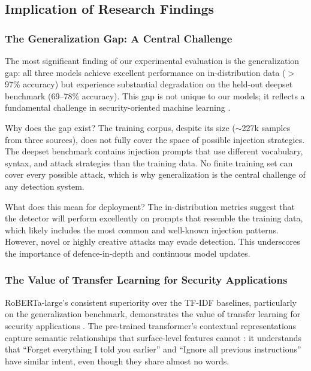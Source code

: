 \documentclass[12pt, letterpaper]{article}   %
\begin{document}
\subsection{Implication of Research Findings}

\subsubsection{The Generalization Gap: A Central Challenge}

The most significant finding of our experimental evaluation is the generalization gap: all three models achieve excellent performance on in-distribution data ($>$97\% accuracy) but experience substantial degradation on the held-out deepset benchmark (69--78\% accuracy). This gap is not unique to our models; it reflects a fundamental challenge in security-oriented machine learning \cite{ref10}\cite{ref3}.

Why does the gap exist? The training corpus, despite its size ($\sim$227k samples from three sources), does not fully cover the space of possible injection strategies. The deepset benchmark contains injection prompts that use different vocabulary, syntax, and attack strategies than the training data. No finite training set can cover every possible attack, which is why generalization is the central challenge of any detection system.

What does this mean for deployment? The in-distribution metrics suggest that the detector will perform excellently on prompts that resemble the training data, which likely includes the most common and well-known injection patterns. However, novel or highly creative attacks may evade detection. This underscores the importance of defence-in-depth and continuous model updates.

\subsubsection{The Value of Transfer Learning for Security Applications}

RoBERTa-large's consistent superiority over the TF-IDF baselines, particularly on the generalization benchmark, demonstrates the value of transfer learning for security applications \cite{ref37}\cite{ref15}. The pre-trained transformer's contextual representations capture semantic relationships that surface-level features cannot \cite{ref33}: it understands that ``Forget everything I told you earlier'' and ``Ignore all previous instructions'' have similar intent, even though they share almost no words.
\end{document}
